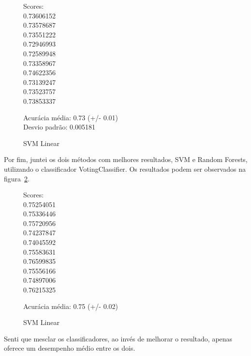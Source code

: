 \documentclass[conference]{IEEEtran}
\begin{document}
\begin{figure}[htb]\caption{SVM Linear}\label{fig:svm_linear}
  \begin{tt}\noindent
  \begin{multicols}{3}
Scores:\\
 0.73606152\\  0.73578687\\  0.73551222\\  0.72946993\\  0.72589948\\  0.73358967\\
  0.74622356\\  0.73139247\\  0.73523757\\  0.73853337\\
  \end{multicols}
Acurácia média: 0.73 (+/- 0.01)\\
Desvio padrão: 0.005181
  \end{tt}
\end{figure}

Por fim, juntei os dois métodos com melhores resultados, SVM e Random Forests, utilizando o classificador VotingClassifier. Os resultados podem ser observados na figura~\ref{fig:voting}.

\begin{figure}[htb]\caption{SVM Linear}\label{fig:voting}
  \begin{tt}\noindent
  \begin{multicols}{3}
Scores:\\
0.75254051\\  0.75336446\\  0.75720956\\  0.74237847\\  0.74045592\\  0.75583631\\
  0.76599835\\  0.75556166\\  0.74897006\\  0.76215325\\
  \end{multicols}
Acurácia média: 0.75 (+/- 0.02)
  \end{tt}
\end{figure}

Senti que mesclar os classificadores, ao invés de melhorar o resultado, apenas oferece um desempenho médio entre os dois.
\end{document}
